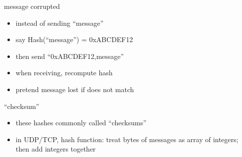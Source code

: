 \begin{frame}{message corrupted}
\begin{itemize}
\item instead of sending ``message''
\vspace{.5cm}
\item say Hash(``message'') = 0xABCDEF12
\item then send ``0xABCDEF12,message''
\vspace{.5cm}
\item when receiving, recompute hash
\item pretend message lost if does not match
\end{itemize}
\end{frame}

\begin{frame}{``checksum''}
\begin{itemize}
\item these hashes commonly called ``checksums''
\item in UDP/TCP, hash function: treat bytes of messages as array of integers; then add integers together
\end{itemize}
\end{frame}
